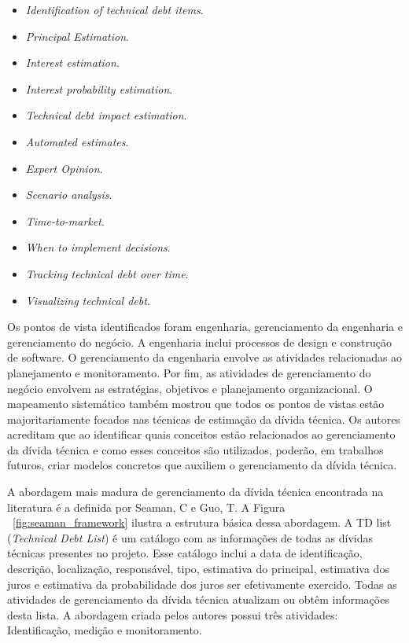 \begin{itemize}
\item \textit{Identification of technical debt items}.
\item \textit{Principal Estimation}.
\item \textit{Interest estimation}.
\item \textit{Interest probability estimation}.
\item \textit{Technical debt impact estimation}.
\item \textit{Automated estimates}.
\item \textit{Expert Opinion}.
\item \textit{Scenario analysis}.
\item \textit{Time-to-market}.
\item \textit{When to implement decisions}.
\item \textit{Tracking technical debt over time}.
\item \textit{Visualizing technical debt}.
\end{itemize}

Os pontos de vista identificados foram engenharia, gerenciamento da engenharia e gerenciamento do negócio. A engenharia inclui processos de design e construção de software. O gerenciamento da engenharia envolve as atividades relacionadas ao planejamento e monitoramento. Por fim, as atividades de gerenciamento do negócio envolvem as estratégias, objetivos  e planejamento organizacional. O mapeamento sistemático também mostrou que todos os pontos de vistas estão majoritariamente focados nas técnicas de estimação da dívida técnica. Os autores acreditam que ao identificar quais conceitos estão relacionados ao gerenciamento da dívida técnica e como esses conceitos são utilizados, poderão, em trabalhos futuros, criar modelos concretos que auxiliem o gerenciamento da dívida técnica.

A abordagem mais madura de gerenciamento da dívida técnica encontrada na literatura é a definida por Seaman, C e Guo, T\cite{seaman2011measuring}. A Figura ~\ref{fig:seaman_framework}  ilustra a estrutura básica dessa abordagem. A TD list (\textit{Technical Debt List}) é um catálogo com as informações de todas as dívidas técnicas presentes no projeto. Esse catálogo inclui a data de identificação, descrição, localização, responsável, tipo, estimativa do principal, estimativa dos juros e estimativa da probabilidade dos juros ser efetivamente exercido. Todas as atividades de gerenciamento da dívida técnica atualizam ou obtêm informações desta lista. A abordagem criada pelos autores possui três atividades: Identificação, medição e monitoramento.  

